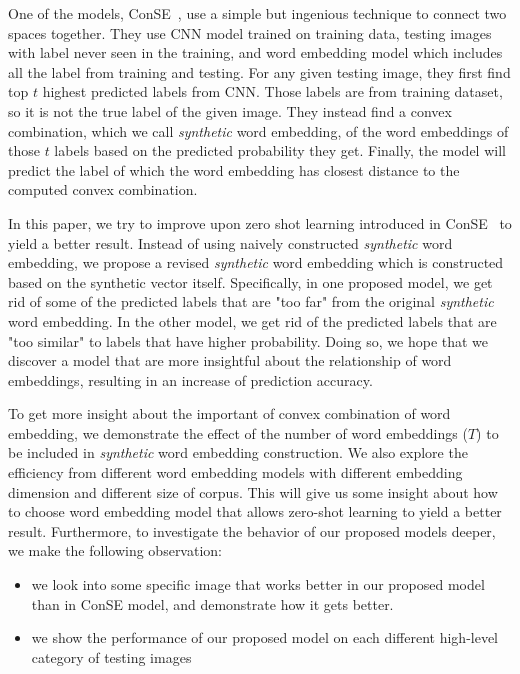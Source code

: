 \documentclass[11pt,letterpaper]{article}
\begin{document}
One of the models, ConSE~\cite{conse}, use a simple but ingenious technique to connect two spaces together. They use CNN model trained on training data, testing images with label never seen in the training, and word embedding model which includes all the label from training and testing. For any given testing image, they first find top $t$ highest predicted labels from CNN. Those labels are from training dataset, so it is not the true label of the given image. They instead find a convex combination, which we call {\em synthetic} word embedding, of the word embeddings of those $t$ labels based on the predicted probability they get. Finally, the model will predict the label of which the word embedding has closest distance to the computed convex combination.  

In this paper, we try to improve upon zero shot learning introduced in ConSE~\cite{conse} to yield a better result. Instead of using naively constructed {\em synthetic} word embedding, we propose a revised {\em synthetic} word embedding which is constructed based on the synthetic vector itself. Specifically, in one proposed model, we get rid of some of the predicted labels that are "too far" from the original {\em synthetic} word embedding. In the other model, we get rid of the predicted labels that are "too similar" to labels that have higher probability. Doing so, we hope that we discover a model that are more insightful about the relationship of word embeddings, resulting in an increase of prediction accuracy. 

To get more insight about the important of convex combination of word embedding, we demonstrate the effect of the number of word embeddings ($T$) to be included in {\em synthetic} word embedding construction. We also explore the efficiency from different word embedding models with different embedding dimension and different size of corpus. This will give us some insight about how to choose word embedding model that allows zero-shot learning to yield a better result. Furthermore, to investigate the behavior of our proposed models deeper, we make the following observation:
\begin{itemize}
\item we look into some specific image that works better in our proposed model than in ConSE model, and demonstrate how it gets better. 
\item we show the performance of our proposed model on each different high-level category of testing images 
\end{itemize}
\end{document}
